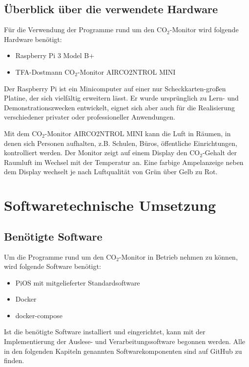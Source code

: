 \documentclass[a4paper,
    11pt,
    headings=small,
    ngerman,
    listof=totoc,
    numbers=noenddot]{scrreprt}[2021/11/13]
\begin{document}
\section{Überblick über die verwendete Hardware}

Für die Verwendung der Programme rund um den CO$_2$-Monitor wird folgende Hardware benötigt:

\begin{itemize}
  \item Raspberry Pi 3 Model B+
  \item TFA-Dostmann CO$_2$-Monitor AIRCO2NTROL MINI
\end{itemize}

Der Raspberry Pi ist ein Minicomputer auf einer nur Scheckkarten-großen Platine, der sich vielfältig erweitern lässt.
Er wurde ursprünglich zu Lern- und Demonstrationszwecken entwickelt, eignet sich aber auch für die
Realisierung verschiedener privater oder professioneller Anwendungen.

Mit dem CO$_2$-Monitor AIRCO2NTROL MINI kann die Luft in Räumen,
in denen sich Personen aufhalten, z.B. Schulen, Büros, öffentliche Einrichtungen, kontrolliert werden. Der Monitor zeigt auf einem Display den CO$_2$-Gehalt der Raumluft im Wechsel mit der Temperatur an. Eine farbige Ampelanzeige neben dem Display wechselt je nach Luftqualität von Grün über Gelb zu Rot.



\chapter{Softwaretechnische Umsetzung}


\section{Benötigte Software}

Um die Programme rund um den CO$_2$-Monitor in Betrieb nehmen zu können, wird folgende Software benötigt:

\begin{itemize}
  \item PiOS mit mitgelieferter Standardsoftware
  \item Docker
  \item docker-compose
\end{itemize}

Ist die benötigte Software installiert und eingerichtet, kann mit der Implementierung der Auslese- und Verarbeitungssoftware begonnen werden. Alle in den folgenden Kapiteln genannten Softwarekomponenten sind auf GitHub zu finden.
\end{document}
